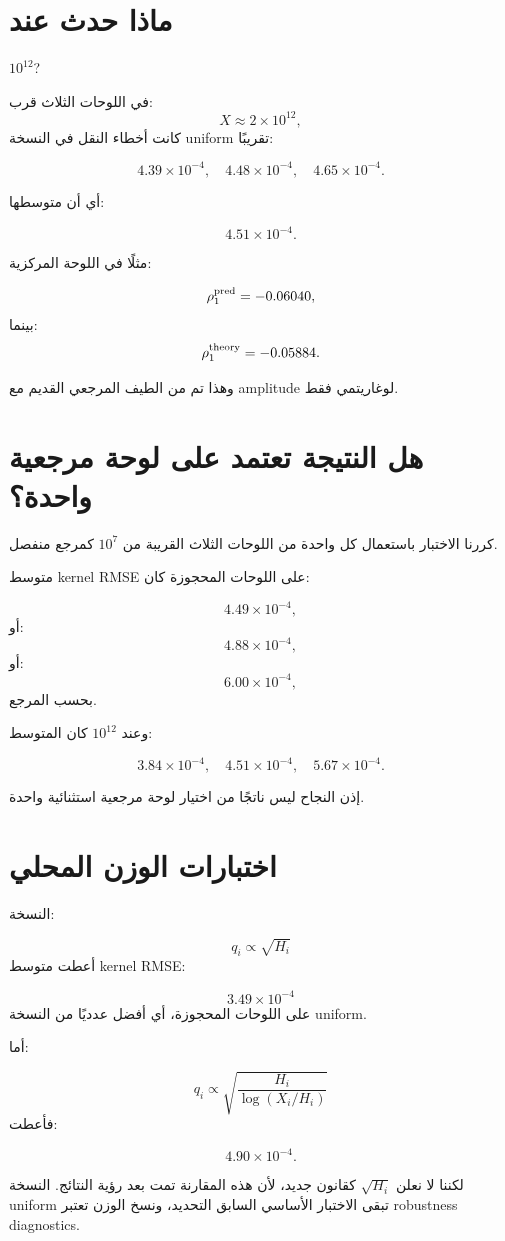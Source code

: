 \documentclass[12pt]{article}
\begin{document}
\section{ماذا حدث عند } \(10^{12}\)?

في اللوحات الثلاث قرب:
\[
X\approx2\times10^{12},
\]
كانت أخطاء النقل في النسخة uniform تقريبًا:

\[
4.39\times10^{-4},
\quad
4.48\times10^{-4},
\quad
4.65\times10^{-4}.
\]

أي أن متوسطها:

\[
\boxed{
4.51\times10^{-4}.
}
\]

مثلًا في اللوحة المركزية:

\[
\rho_1^{\rm pred}
=
-0.06040,
\]
بينما:
\[
\rho_1^{\rm theory}
=
-0.05884.
\]

وهذا تم من الطيف المرجعي القديم مع amplitude لوغاريتمي فقط.

\section{هل النتيجة تعتمد على لوحة مرجعية واحدة؟}

كررنا الاختبار باستعمال كل واحدة من اللوحات الثلاث القريبة من \(10^7\)
كمرجع منفصل.

متوسط kernel RMSE على اللوحات المحجوزة كان:

\[
4.49\times10^{-4},
\]
أو:
\[
4.88\times10^{-4},
\]
أو:
\[
6.00\times10^{-4},
\]
بحسب المرجع.

وعند \(10^{12}\) كان المتوسط:

\[
3.84\times10^{-4},
\quad
4.51\times10^{-4},
\quad
5.67\times10^{-4}.
\]

إذن النجاح ليس ناتجًا من اختيار لوحة مرجعية استثنائية واحدة.

\section{اختبارات الوزن المحلي}

النسخة:

\[
q_i\propto\sqrt{H_i}
\]
أعطت متوسط kernel RMSE:

\[
\boxed{
3.49\times10^{-4}
}
\]
على اللوحات المحجوزة، أي أفضل عدديًا من النسخة uniform.

أما:

\[
q_i
\propto
\sqrt{
\frac{H_i}{\log(X_i/H_i)}
}
\]
فأعطت:

\[
4.90\times10^{-4}.
\]

لكننا لا نعلن \(\sqrt{H_i}\) كقانون جديد، لأن هذه المقارنة تمت بعد رؤية
النتائج. النسخة uniform تبقى الاختبار الأساسي السابق التحديد، ونسخ الوزن
تعتبر robustness diagnostics.
\end{document}
